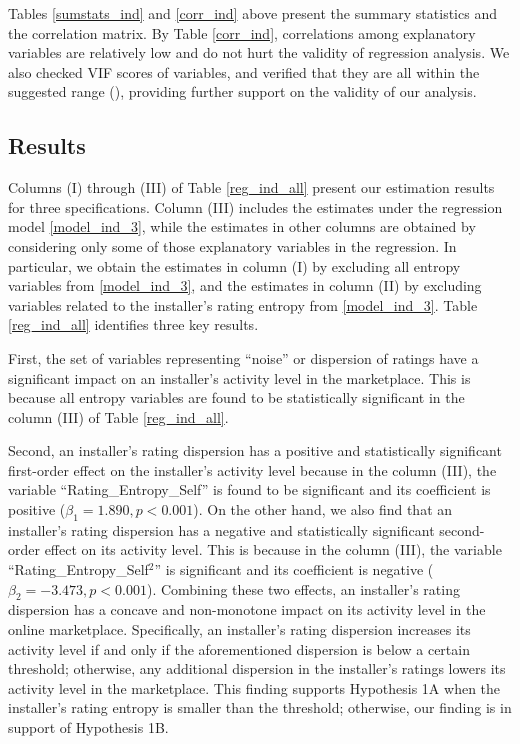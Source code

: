\documentclass[mnsc,blindrev]{informs3}
\begin{document}
	
	
	
	
	Tables \ref{sumstats_ind} and \ref{corr_ind} above present the summary statistics and the correlation matrix. By Table \ref{corr_ind}, correlations among explanatory variables are relatively low and do not hurt the validity of regression analysis. We also checked VIF scores of variables, and verified that they are all within the suggested range (\cite{hairmultivariate}), providing further support on the validity of our analysis.
	

	
	\subsection{Results}
	
Columns (I) through (III) of Table \ref{reg_ind_all} present our estimation results for three specifications. Column (III) includes the estimates under the regression model \eqref{model_ind_3}, while the estimates in other columns are obtained by considering only some of those explanatory variables in the regression. In particular, we obtain the estimates in column (I) by excluding all entropy variables from \eqref{model_ind_3}, and the estimates in column (II) by excluding variables related to the installer's rating entropy from \eqref{model_ind_3}. Table \ref{reg_ind_all} identifies three key results.




First, the set of variables representing ``noise'' or dispersion of ratings have a significant impact on an installer's activity level in the marketplace. This is because  all entropy variables are found to be statistically significant in the column (III) of Table \ref{reg_ind_all}.
	
	Second, an installer's rating dispersion has a positive and statistically significant first-order effect on the installer's activity level because in the column (III), the variable ``Rating\_Entropy\_Self'' is found to be significant and its coefficient is positive ($\beta_{1} = 1.890,p<0.001$). On the other hand, we also find that an installer's rating dispersion has a negative and statistically significant second-order effect on its activity level. This is because in the column (III), the variable ``Rating\_Entropy\_Self$^2$'' is significant and its coefficient is negative ($\beta_{2} = -3.473, p<0.001$). Combining these two effects, an installer's rating dispersion has a concave and non-monotone impact on its activity level in the online marketplace. Specifically,  an installer's rating dispersion increases its activity level if and only if the aforementioned dispersion is below a certain threshold; otherwise, any additional dispersion in the installer's ratings lowers its activity level in the marketplace. This finding supports Hypothesis 1A when the installer's rating entropy is smaller than the threshold; otherwise, our finding is in support of Hypothesis 1B.
	
\end{document}
